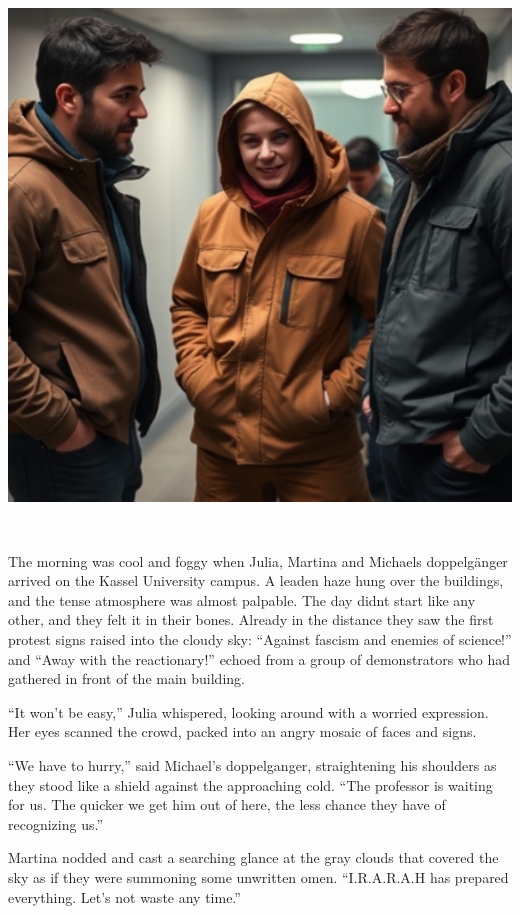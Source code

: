 \documentclass[
]{article}
\begin{document}
\includegraphics[width=5.88542in,height=5.79167in]{media/image006.png}

The morning was cool and foggy when Julia, Martina and
Michael\textquotesingle s doppelgänger arrived on the Kassel University
campus. A leaden haze hung over the buildings, and the tense atmosphere
was almost palpable. The day didn\textquotesingle t start like any
other, and they felt it in their bones. Already in the distance they saw
the first protest signs raised into the cloudy sky: ``Against fascism
and enemies of science!'' and ``Away with the reactionary!'' echoed from
a group of demonstrators who had gathered in front of the main building.

``It won't be easy,'' Julia whispered, looking around with a worried
expression. Her eyes scanned the crowd, packed into an angry mosaic of
faces and signs.

``We have to hurry,'' said Michael's doppelganger, straightening his
shoulders as they stood like a shield against the approaching cold.
``The professor is waiting for us. The quicker we get him out of here,
the less chance they have of recognizing us.''

Martina nodded and cast a searching glance at the gray clouds that
covered the sky as if they were summoning some unwritten omen.
``I.R.A.R.A.H has prepared everything. Let's not waste any time.''
\end{document}
